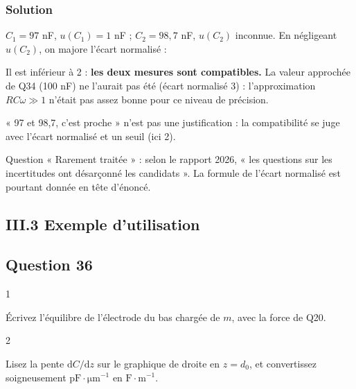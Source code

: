 \documentclass[11pt,a4paper]{article}
\newcommand{\equationajustee}[1]{%
  \sbox{\boiteequation}{$\displaystyle #1$}%
  \ifdim\wd\boiteequation>\linewidth
    \[\resizebox{\linewidth}{!}{\usebox{\boiteequation}}\]%
  \else
    \[#1\]%
  \fi}
\begin{document}
\hypertarget{solution-34}{%
\subsubsection{Solution}\label{solution-34}}

\(C_1=97\) nF, \(u(C_1)=1\) nF ; \(C_2=98{,}7\) nF, \(u(C_2)\) inconnue. En négligeant \(u(C_2)\), on majore l'écart normalisé :

\equationajustee{\frac{|C_2-C_1|}{\sqrt{u(C_1)^2+u(C_2)^2}}\le\frac{1{,}7}{1}=1{,}7 .}

Il est inférieur à 2 : \textbf{les deux mesures sont compatibles.} La valeur approchée de Q34 (100 nF) ne l'aurait pas été (écart normalisé 3) : l'approximation \(RC\omega\gg1\) n'était pas assez bonne pour ce niveau de précision.

\begin{piege}

« 97 et 98,7, c'est proche » n'est pas une justification : la compatibilité se juge avec l'écart normalisé et un seuil (ici 2).

\end{piege}

\begin{jury}

Question « Rarement traitée » : selon le rapport 2026, « les questions sur les incertitudes ont désarçonné les candidats ». La formule de l'écart normalisé est pourtant donnée en tête d'énoncé.

\end{jury}

\hypertarget{iii.3-exemple-dutilisation}{%
\subsection{III.3 Exemple d'utilisation}\label{iii.3-exemple-dutilisation}}

\hypertarget{question-36}{%
\subsection{Question 36}\label{question-36}}

\begin{indication}{1}

Écrivez l'équilibre de l'électrode du bas chargée de \(m\), avec la force de Q20.

\end{indication}

\begin{indication}{2}

Lisez la pente \(\mathrm{d}C/\mathrm{d}z\) sur le graphique de droite en \(z=d_0\), et convertissez soigneusement \(\mathrm{pF\cdot\mu m^{-1}}\) en \(\mathrm{F\cdot m^{-1}}\).

\end{indication}
\end{document}
